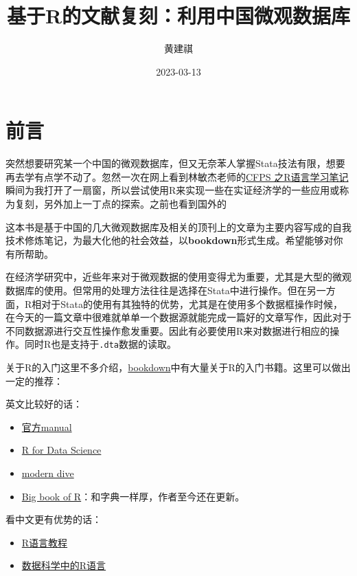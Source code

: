 \documentclass[
  oneside]{book}
\title{基于R的文献复刻：利用中国微观数据库}
\author{黄建祺}
\date{2023-03-13}
\begin{document}
\maketitle

{
\setcounter{tocdepth}{1}
\tableofcontents
}
\hypertarget{ux524dux8a00}{%
\chapter*{前言}\label{ux524dux8a00}}

突然想要研究某一个中国的微观数据库，但又无奈苯人掌握Stata技法有限，想要再去学有点学不动了。忽然一次在网上看到林敏杰老师的\href{https://bookdown.org/wangminjie/R4cfps/}{CFPS 之R语言学习笔记}瞬间为我打开了一扇窗，所以尝试使用R来实现一些在实证经济学的一些应用或称为复刻，另外加上一丁点的探索。之前也看到国外的

这本书是基于中国的几大微观数据库及相关的顶刊上的文章为主要内容写成的自我技术修炼笔记，为最大化他的社会效益，以\textbf{bookdown}形式生成。希望能够对你有所帮助。

在经济学研究中，近些年来对于微观数据的使用变得尤为重要，尤其是大型的微观数据库的使用。但常用的处理方法往往是选择在Stata中进行操作。但在另一方面，R相对于Stata的使用有其独特的优势，尤其是在使用多个数据框操作时候，在今天的一篇文章中很难就单单一个数据源就能完成一篇好的文章写作，因此对于不同数据源进行交互性操作愈发重要。因此有必要使用R来对数据进行相应的操作。同时R也是支持于\texttt{.dta}数据的读取。

关于R的入门这里不多介绍，\href{www.bookdown.org}{bookdown}中有大量关于R的入门书籍。这里可以做出一定的推荐：

英文比较好的话：

\begin{itemize}
\item
  \href{file:///Library/Frameworks/R.framework/Versions/4.2-arm64/Resources/doc/manual/R-intro.html}{官方manual}
\item
  \href{https://r4ds.had.co.nz/}{R for Data Science}
\item
  \href{https://moderndive.com/}{modern dive}
\item
  \href{https://www.bigbookofr.com/}{Big book of R}：和字典一样厚，作者至今还在更新。
\end{itemize}

看中文更有优势的话：

\begin{itemize}
\item
  \href{https://www.math.pku.edu.cn/teachers/lidf/docs/Rbook/html/_Rbook/index.html}{R语言教程}
\item
  \href{https://bookdown.org/wangminjie/R4DS/}{数据科学中的R语言}
\end{itemize}
\end{document}
